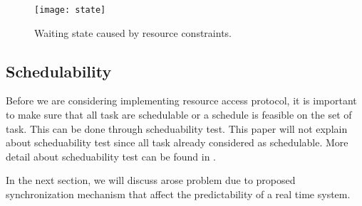 \begin{figure}[h]
    \centering
    \texttt{[image: state]}
    \caption{Waiting state caused by resource constraints. \cite{b5}}
    \label{fig:state}
\end{figure}



\subsection{Schedulability}

Before we are considering implementing resource access protocol, it is important to make sure that all task are schedulable or a schedule is feasible on the set of task. This can be done through scheduability test. This paper will not explain about scheduability test since all task already considered as schedulable. More detail about scheduability test can be found in \cite{b5}.

In the next section, we will discuss arose problem due to proposed synchronization mechanism that affect the predictability of a real time system.